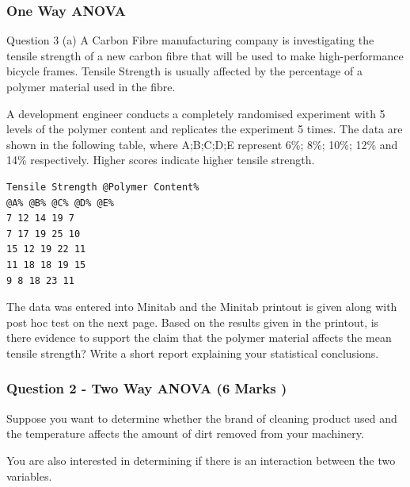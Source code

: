 \documentclass[a4paper,12pt]{article}
\begin{document}
\subsubsection{One Way ANOVA}
Question 3
(a) A Carbon Fibre manufacturing company is investigating the tensile strength of a
new carbon fibre that will be used to make high-performance bicycle frames. Tensile
Strength is usually affected by the percentage of a polymer material used in the fibre.


A development engineer conducts a completely randomised experiment with 5 levels
of the polymer content and replicates the experiment 5 times. The data are shown in
the following table, where A;B;C;D;E represent 6\%; 8\%; 10\%; 12\% and 14\%
respectively. Higher scores indicate higher tensile strength.
\begin{verbatim}
Tensile Strength @Polymer Content%
@A% @B% @C% @D% @E%
7 12 14 19 7
7 17 19 25 10
15 12 19 22 11
11 18 18 19 15
9 8 18 23 11
\end{verbatim}

The data was entered into Minitab and the Minitab printout is given along with post
hoc test on the next page. Based on the results given in the printout, is there evidence
to support the claim that the polymer material affects the mean tensile strength? Write
a short report explaining your statistical conclusions.


\newpage
\subsubsection*{Question 2 - Two Way ANOVA (6 Marks )}
\noindent Suppose you want to determine whether the brand of cleaning product used and the temperature affects the amount of dirt removed from your machinery. 

\noindent You are also interested in determining if there is an interaction between the two variables.
\end{document}
